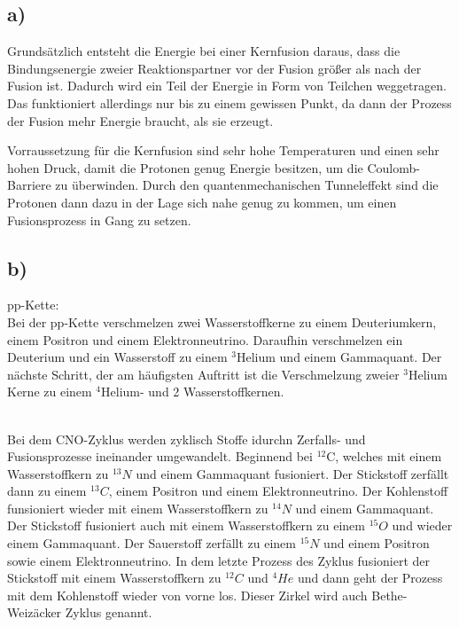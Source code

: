 \newpage
\subsection{a)}

Grundsätzlich entsteht die Energie bei einer Kernfusion daraus, dass die Bindungsenergie zweier
Reaktionspartner vor der Fusion größer als nach der Fusion ist. Dadurch wird ein Teil der Energie
in Form von Teilchen weggetragen. Das funktioniert allerdings nur bis zu einem gewissen Punkt,
da dann der Prozess der Fusion mehr Energie braucht, als sie erzeugt.

\justifying Vorraussetzung für die Kernfusion sind sehr hohe Temperaturen und einen sehr hohen Druck, damit die Protonen genug Energie besitzen,
um die Coulomb-Barriere zu überwinden. Durch den quantenmechanischen Tunneleffekt sind die Protonen 
dann dazu in der Lage sich nahe genug zu kommen, um einen Fusionsprozess in Gang zu setzen. 


\subsection{b)}

pp-Kette:\\
Bei der pp-Kette verschmelzen zwei Wasserstoffkerne zu einem Deuteriumkern, einem Positron und einem Elektronneutrino.
Daraufhin verschmelzen ein Deuterium und ein Wasserstoff zu einem $^3$Helium und einem Gammaquant.
Der nächste Schritt, der am häufigsten Auftritt ist die Verschmelzung zweier $^3$Helium Kerne zu
einem $^4$Helium- und 2 Wasserstoffkernen.


\justifying\\
Bei dem CNO-Zyklus werden zyklisch Stoffe idurchn Zerfalls- und Fusionsprozesse ineinander umgewandelt.
Beginnend bei $^{12}$C, welches mit einem Wasserstoffkern zu $^{13}N $ und einem Gammaquant fusioniert. 
Der Stickstoff zerfällt dann zu einem $^{13} C$, einem Positron und einem Elektronneutrino.
Der Kohlenstoff funsioniert wieder mit einem Wasserstoffkern zu $^{14}N $ und einem Gammaquant.
Der Stickstoff fusioniert auch mit einem Wasserstoffkern zu einem $^{15}O $ und wieder einem Gammaquant.
Der Sauerstoff zerfällt zu einem $^{15}N $ und einem Positron sowie einem Elektronneutrino.
In dem letzte Prozess des Zyklus fusioniert der Stickstoff mit einem Wasserstoffkern zu $^{12}C$ und $^4He$
und dann geht der Prozess mit dem Kohlenstoff wieder von vorne los. Dieser Zirkel wird auch Bethe-Weizäcker Zyklus genannt.


